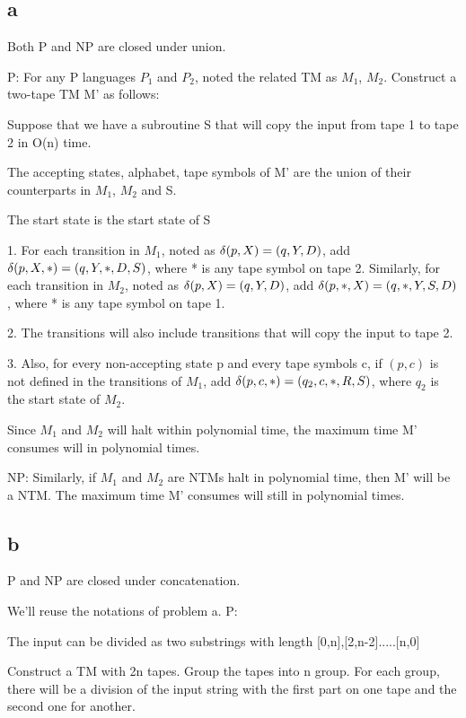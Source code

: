 \documentclass[a4paper,UTF8]{ctexart}
\theoremstyle{definition}
\begin{document}
\subsection*{a}
Both P and NP are closed under union.

P: For any P languages $P_1$ and $P_2$, noted the related TM as $M_1$, $M_2$. Construct 
a two-tape TM M' as follows:

Suppose that we have a subroutine S that will copy the input from tape 1 to tape 2 in O(n) time.

The accepting states, alphabet, tape symbols of M' are the union of
 their counterparts in $M_1$, $M_2$ and S.


The start state is the start state of S

1. For each transition in $M_1$, noted as $\delta(p,X)=(q,Y,D)$,
 add $\delta(p,X,*)=(q,Y,*,D,S)$, where * is any tape symbol on tape 2.
Similarly, for each transition in $M_2$, noted as $\delta(p,X)=(q,Y,D)$,
 add $\delta(p,*, X)=(q,*,Y,S, D)$, where * is any tape symbol on tape 1.

2. The transitions will also include transitions that will copy the input to tape 2.

3. Also, for every  
non-accepting state p and every tape symbols c, if $(p,c)$ is not defined in the 
transitions of $M_1$, add $\delta(p,c,*)=(q_2,c,*,R,S)$, where $q_2$ is the start state of $M_2$.

Since $M_1$ and $M_2$ will halt within polynomial time, the maximum time M' consumes will in 
polynomial times.

NP: Similarly, if $M_1$ and $M_2$ are NTMs halt in polynomial time,
 then M' will be a NTM. The maximum time M' consumes will still in 
polynomial times.

\subsection*{b}
P and NP are closed under concatenation. 

We'll reuse the notations of problem a.
P: 

The input can be divided as two substrings with length [0,n],[2,n-2].....[n,0]

Construct a TM with 2n tapes. Group the tapes into n group.
For each group, there will be a division of the input string with the 
first part on one tape and the second one for another.
\end{document}
